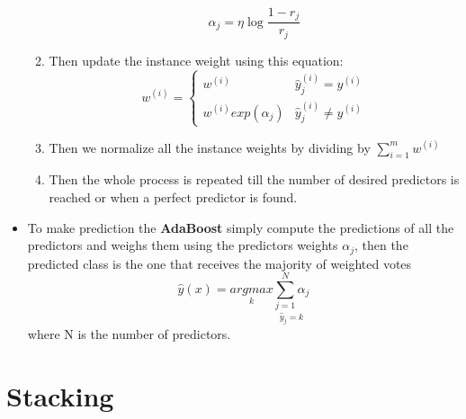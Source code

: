\documentclass{article}
\begin{document}
\begin{itemize}
\begin{enumerate}
    		\[ \alpha_{j} = \eta \log \frac{1 - r_{j}}{r_{j}} \]
    		\item Then update the instance weight using this equation:
    		\[ w^{(i)} = \begin{cases} 
      			w^{(i)} & \hat{y}_{j}^{(i)} = y^{(i)} \\
      			w^{(i)} exp(\alpha_{j}) & \hat{y}_{j}^{(i)} \neq y^{(i)}
   				\end{cases}
			\]
			\item Then we normalize all the instance weights by dividing by $\sum_{i = 1}^{m} w^{(i)}$
			\item Then the whole process is repeated till the number of desired predictors is reached or when a perfect predictor is found.
    	\end{enumerate}
    	\item To make prediction the \textbf{AdaBoost} simply compute the predictions of all the predictors and weighs them using the predictors weights $\alpha_{j}$, then the predicted class is the one that receives the majority of weighted votes
    	\[ \hat{y}(x) = \underset{k}{argmax} \underset{\hat{y}_{j} = k}{\sum_{j = 1}^{N} \alpha_{j}} \]
    	where N is the number of predictors. 
    \end{itemize}
	\section{Stacking} 
\end{document}
